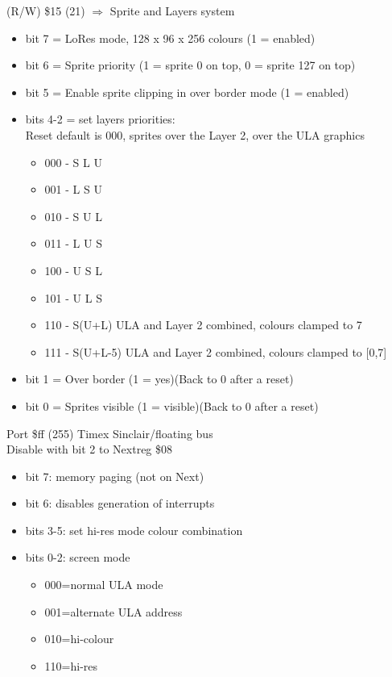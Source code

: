 (R/W) \$15 (21) $\Rightarrow$ Sprite and Layers system
\begin{itemize}
\item[] bit 7 = LoRes mode, 128 x 96 x 256 colours (1 = enabled)
\item[] bit 6 = Sprite priority (1 = sprite 0 on top, 0 = sprite 127 on top)
\item[] bit 5 = Enable sprite clipping in over border mode (1 = enabled)
\item[] bits 4-2 = set layers priorities:\\
  Reset default is 000, sprites over the Layer 2, over the ULA graphics
  \begin{itemize}
  \item[] 000 - S L U
  \item[] 001 - L S U
  \item[] 010 - S U L
  \item[] 011 - L U S
  \item[] 100 - U S L
  \item[] 101 - U L S
  \item[] 110 - S(U+L) ULA and Layer 2 combined, colours clamped to 7
  \item[] 111 - S(U+L-5) ULA and Layer 2 combined, colours clamped to [0,7]
  \end{itemize}
\item[] bit 1 = Over border (1 = yes)(Back to 0 after a reset)
\item[] bit 0 = Sprites visible (1 = visible)(Back to 0 after a reset)
\end{itemize}

Port \$ff (255) Timex Sinclair/floating bus\\
Disable with bit 2 to Nextreg \$08
\begin{itemize}
\item[] bit 7: memory paging (not on Next)
\item[] bit 6: disables generation of interrupts
\item[] bits 3-5: set hi-res mode colour combination
\item[] bits 0-2: screen mode
  \begin{itemize}
  \item[] 000=normal ULA mode
  \item[] 001=alternate ULA address
  \item[] 010=hi-colour
  \item[] 110=hi-res
  \end{itemize}
\end{itemize}

